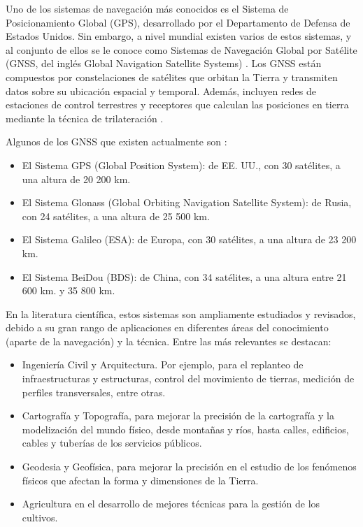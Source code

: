 Uno de los sistemas de navegación más conocidos es el Sistema de Posicionamiento Global (GPS), desarrollado por el Departamento de Defensa de Estados Unidos. Sin embargo, a nivel mundial existen varios de estos sistemas, y al conjunto de ellos se le conoce como Sistemas de Navegación Global por Satélite (GNSS, del inglés Global Navigation Satellite Systems) \citep{GNSS-ONU}. Los GNSS están compuestos por constelaciones de satélites que orbitan la Tierra y transmiten datos sobre su ubicación espacial y temporal. Además, incluyen redes de estaciones de control terrestres y receptores que calculan las posiciones en tierra mediante la técnica de trilateración \citep{GNSS-ONU}. 

Algunos de los GNSS que existen actualmente son \citep{GNSS-Junta-Adalucia}:

\begin{itemize}
    \item El Sistema GPS (Global Position System): de EE. UU., con 30 satélites, a una altura de 20 200 km.
    \item El Sistema Glonass (Global Orbiting Navigation Satellite System): de Rusia, con 24 satélites, a una altura de 25 500 km.
    \item El Sistema Galileo (ESA): de Europa, con 30 satélites, a una altura de 23 200 km.
    \item El Sistema BeiDou (BDS): de China, con 34 satélites, a una altura entre 21 600 km. y 35 800  km.
\end{itemize}

En la literatura científica, estos sistemas son ampliamente estudiados y revisados, debido a su gran rango de aplicaciones en diferentes áreas del conocimiento (aparte de la navegación) y la técnica. Entre las más relevantes se destacan:

\begin{itemize}
    \item Ingeniería Civil y Arquitectura. Por ejemplo, para el replanteo de infraestructuras y estructuras, control del movimiento de tierras, medición de perfiles transversales, entre otras.
    \item Cartografía y Topografía, para mejorar la precisión de la cartografía y la modelización del mundo físico, desde montañas y ríos, hasta calles, edificios, cables y tuberías de los servicios públicos.
    \item Geodesia y Geofísica, para mejorar la precisión en el estudio de los fenómenos físicos que afectan la forma y dimensiones de la Tierra.
    \item Agricultura en el desarrollo de mejores técnicas para la gestión de los cultivos. 
\end{itemize}

